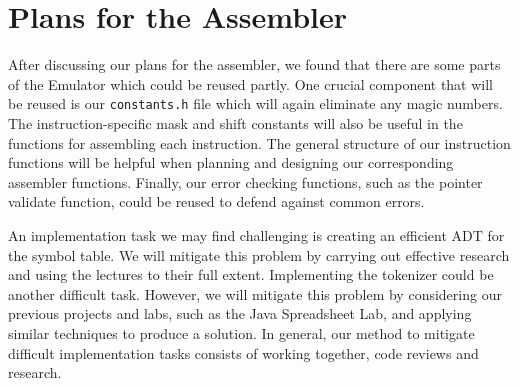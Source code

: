 \documentclass[10pt]{article}
\begin{document}


\section*{Plans for the Assembler}
After discussing our plans for the assembler, we found that there are some parts of the Emulator which could be reused partly. One crucial component that will be reused is our {\tt constants.h} file which will again eliminate any magic numbers. The instruction-specific mask and shift constants will also be useful in the functions for assembling each instruction. The general structure of our instruction functions will be helpful when planning and designing our corresponding assembler functions. Finally, our error checking functions, such as the pointer validate function, could be reused to defend against common errors.

An implementation task we may find challenging is creating an efficient ADT for the symbol table. We will mitigate this problem by carrying out effective research and using the lectures to their full extent. Implementing the tokenizer could be another difficult task. However, we will mitigate this problem by considering our previous projects and labs, such as the Java Spreadsheet Lab, and applying similar techniques to produce a solution. In general, our method to mitigate difficult implementation tasks consists of working together, code reviews and research.
\end{document}
